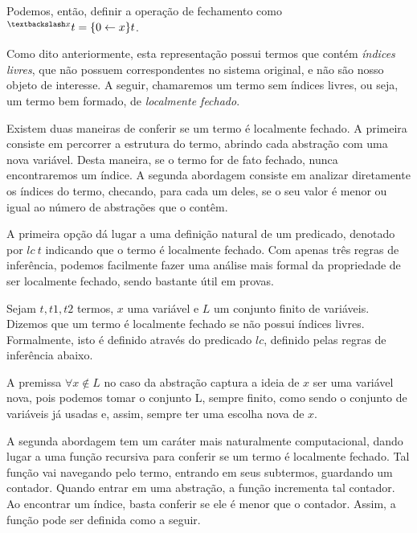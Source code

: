 Podemos, então, definir a operação de fechamento como $ ^{\textbackslash x}t
= \{0 \leftarrow x\}t$.

Como dito anteriormente, esta representação possui termos que contém
\emph{índices livres}, que não possuem correspondentes no sistema original, e
não são nosso objeto de interesse. A seguir, chamaremos um termo sem índices
livres, ou seja, um termo bem formado, de \emph{localmente fechado}.

Existem duas maneiras de conferir se um termo é localmente fechado. A primeira
consiste em percorrer a estrutura do termo, abrindo cada abstração com uma nova
variável. Desta maneira, se o termo for de fato fechado, nunca encontraremos um
índice. A segunda abordagem consiste em analizar diretamente os índices do termo,
checando, para cada um deles, se o seu valor é menor ou igual ao número de
abstrações que o contêm.

A primeira opção dá lugar a uma definição natural de um predicado, denotado por
$lc\ t$ indicando que o termo é localmente fechado. Com apenas três regras
de inferência, podemos facilmente fazer uma análise mais formal da propriedade
de ser localmente fechado, sendo bastante útil em provas.

\begin{definicao}\label{def_lc}
    Sejam $t, t1, t2$ termos, $x$ uma variável e $L$ um conjunto finito de
    variáveis. Dizemos que um termo é localmente fechado se não possui índices
    livres. Formalmente, isto é definido através do predicado $lc$, definido
    pelas regras de inferência abaixo.

\end{definicao}

A premissa $\forall x \notin L$ no caso da abstração captura a ideia de $x$
ser uma variável nova, pois podemos tomar o conjunto L, sempre finito, como
sendo o conjunto de variáveis já usadas e, assim, sempre ter uma escolha nova de
$x$.

A segunda abordagem tem um caráter mais naturalmente computacional, dando lugar
a uma função recursiva para conferir se um termo é localmente fechado. Tal
função vai navegando pelo termo, entrando em seus subtermos, guardando um
contador. Quando entrar em uma abstração, a função incrementa tal contador. Ao
encontrar um índice, basta conferir se ele é menor que o contador. Assim, a
função pode ser definida como a seguir.

